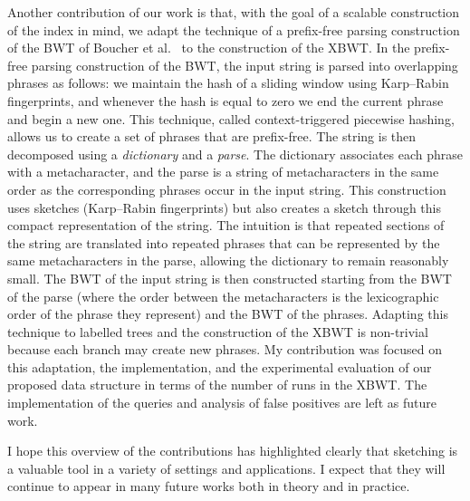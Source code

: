Another contribution of our work is that, with the goal of a scalable construction of the index in mind, we adapt the technique of a prefix-free parsing construction of the BWT of Boucher et al.~\cite{boucher2019prefix} to the construction of the XBWT. 
In the prefix-free parsing construction of the BWT, the input string is parsed into overlapping phrases as follows: we maintain the hash of a sliding window using Karp--Rabin fingerprints, and whenever the hash is equal to zero we end the current phrase and begin a new one. This technique, called context-triggered piecewise hashing, allows us to create a set of phrases that are prefix-free.
The string is then decomposed using a \emph{dictionary} and a \emph{parse}. 
The dictionary associates each phrase with a metacharacter, and the parse is a string of metacharacters in the same order as the corresponding phrases occur in the input string.
This construction uses sketches (Karp--Rabin fingerprints) but also creates a sketch through this compact representation of the string.
The intuition is that repeated sections of the string are translated into repeated phrases that can be represented by the same metacharacters in the parse, allowing the dictionary to remain reasonably small.
The BWT of the input string is then constructed starting from the BWT of the parse (where the order between the metacharacters is the lexicographic order of the phrase they represent) and the BWT of the phrases.
Adapting this technique to labelled trees and the construction of the XBWT is non-trivial because each branch may create new phrases. My contribution was focused on this adaptation, the implementation, and the experimental evaluation of our proposed data structure in terms of the number of runs in the XBWT. The implementation of the queries and analysis of false positives are left as future work.


I hope this overview of the contributions has highlighted clearly that sketching is a valuable tool in a variety of settings and applications. I expect that they will continue to appear in many future works both in theory and in practice.